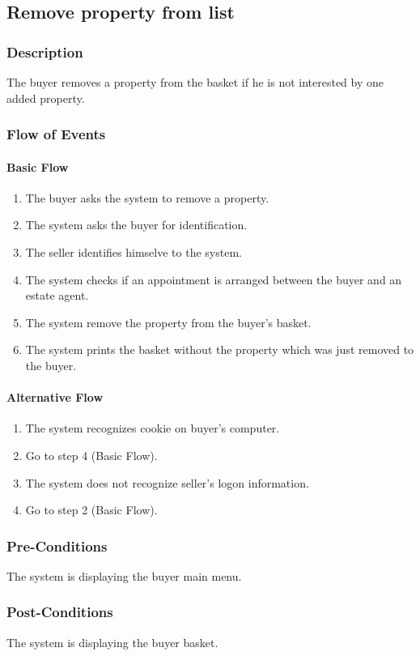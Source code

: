 \documentclass[a4paper,12pt]{article}
\begin{document}
\subsection{Remove property from list}
\subsubsection{Description}
The buyer removes a property from the basket if he is not interested by one added property.
\subsubsection{Flow of Events}
\paragraph{Basic Flow}
\begin{enumerate}
\item The buyer asks the system to remove a property.
\item The system asks the buyer for identification.
\item The seller identifies himselve to the system.
\item The system checks if an appointment is arranged between the buyer and an estate agent.
\item The system remove the property from the buyer's basket.
\item The system prints the basket without the property which was just removed to the buyer.
\end{enumerate}
\paragraph{Alternative Flow}
\begin{enumerate}
\item The system recognizes cookie on buyer's computer. 
\item Go to step 4 (Basic Flow).
\item The system does not recognize seller's logon information.
\item Go to step 2 (Basic Flow).
\end{enumerate}
\subsubsection{Pre-Conditions}
The system is displaying the buyer main menu.
\subsubsection{Post-Conditions}
The system is displaying the buyer basket.
\end{document}
